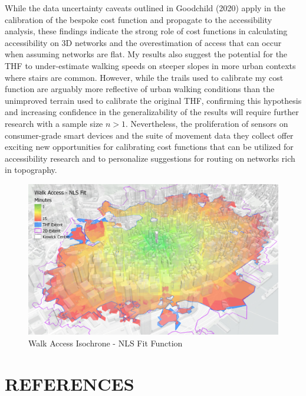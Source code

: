 \documentclass{article}
\begin{document}
While the data uncertainty caveats outlined in Goodchild (2020) apply in
the calibration of the bespoke cost function and propagate to the
accessibility analysis, these findings indicate the strong role of cost
functions in calculating accessibility on 3D networks and the
overestimation of access that can occur when assuming networks are flat.
My results also suggest the potential for the THF to under-estimate
walking speeds on steeper slopes in more urban contexts where stairs are
common. However, while the trails used to calibrate my cost function are
arguably more reflective of urban walking conditions than the unimproved
terrain used to calibrate the original THF, confirming this hypothesis
and increasing confidence in the generalizability of the results will
require further research with a sample size \(n>1\). Nevertheless, the
proliferation of sensors on consumer-grade smart devices and the suite
of movement data they collect offer exciting new opportunities for
calibrating cost functions that can be utilized for accessibility
research and to personalize suggestions for routing on networks rich in
topography.

\begin{figure}[H]
\includegraphics[width=1\linewidth]{./img/Fig_3} \caption{Walk Access Isochrone - NLS Fit Function}\label{fig:fig 3}
\end{figure}

\hypertarget{references}{%
\section*{REFERENCES}\label{references}}
\end{document}
